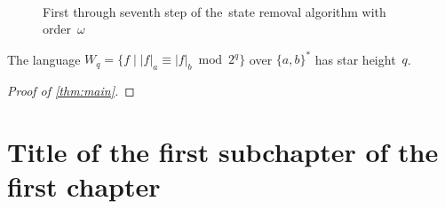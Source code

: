 \begin{figure}%
    \centering
    \subfloat[][]{%
        \label{fig:automaton_R8_state_removal_steps-a}%
        }%
    \hspace{70pt}%
    \subfloat[][]{%
        \label{fig:automaton_R8_state_removal_steps-b}%
        }\\
    \subfloat[][]{%
        \label{fig:automaton_R8_state_removal_steps-c}%
        }%
    \hspace{8pt}%
    \subfloat[][]{%
        \label{fig:automaton_R8_state_removal_steps-d}%
        }\\
    \subfloat[][]{%
        \label{fig:automaton_R8_state_removal_steps-e}%
        }\\
    \subfloat[][]{%
        \label{fig:automaton_R8_state_removal_steps-e}%
        }%
    \hspace{20pt}%
    \subfloat[][]{%
        \label{fig:automaton_R8_state_removal_steps-e}%
        }%
    \caption{First through seventh step of the~state removal algorithm with order~$\omega$}%
    \label{fig:automaton_R8_state_removal_steps}%
\end{figure}

\begin{thm}\label{thm:main}
    The language $W_q = {\{f \mid |f|_a \equiv |f|_b \bmod 2^q \}}$ over ${\{a, b\}}^*$ has star height~$q$.
\end{thm}

\begin{proof}[Proof of \autoref*{thm:main}]
\end{proof}

\section{Title of the first subchapter of the first chapter}